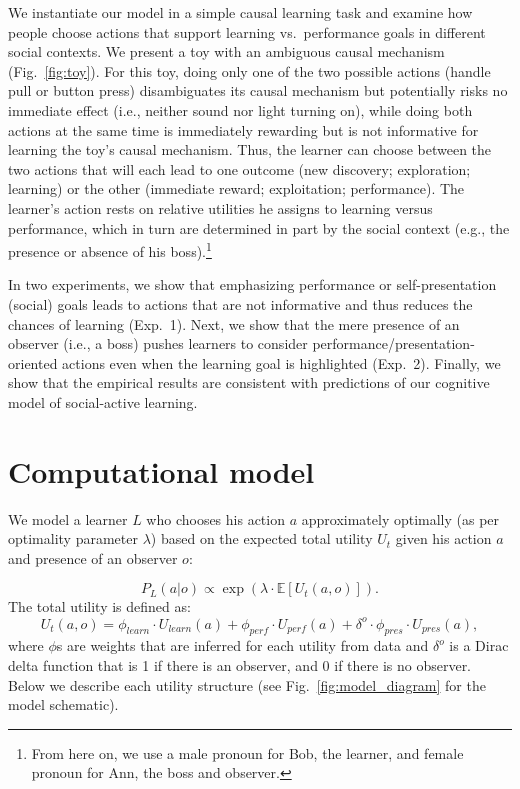 \documentclass[10pt, letterpaper]{article}
\begin{document}
We instantiate our model in a simple causal learning task and examine
how people choose actions that support learning vs.~performance goals in
different social contexts. We present a toy with an ambiguous causal
mechanism (Fig.~\ref{fig:toy}). For this toy, doing only one of the two
possible actions (handle pull or button press) disambiguates its causal
mechanism but potentially risks no immediate effect (i.e., neither sound
nor light turning on), while doing both actions at the same time is
immediately rewarding but is not informative for learning the toy's
causal mechanism. Thus, the learner can choose between the two actions
that will each lead to one outcome (new discovery; exploration;
learning) or the other (immediate reward; exploitation; performance).
The learner's action rests on relative utilities he assigns to learning
versus performance, which in turn are determined in part by the social
context (e.g., the presence or absence of his
boss).\footnote{From here on, we use a male pronoun for Bob, the learner, and female pronoun for Ann, the boss and observer.}

In two experiments, we show that emphasizing performance or
self-presentation (social) goals leads to actions that are not
informative and thus reduces the chances of learning (Exp.~1). Next, we
show that the mere presence of an observer (i.e., a boss) pushes
learners to consider performance/presentation-oriented actions even when
the learning goal is highlighted (Exp.~2). Finally, we show that the
empirical results are consistent with predictions of our cognitive model
of social-active learning.

\section{Computational model}\label{computational-model}

We model a learner \(L\) who chooses his action \(a\) approximately
optimally (as per optimality parameter \(\lambda\)) based on the
expected total utility \(U_{t}\) given his action \(a\) and presence of
an observer \(o\):

\[ P_L(a | o) \propto \exp(\lambda \cdot \mathbb{E}[U_{t}(a,o)]).\]
\noindent
The total utility is defined as:
\[U_{t}(a,o) = \phi_{learn} \cdot U_{learn}(a) + \phi_{perf} \cdot U_{perf}(a) + \delta^o \cdot \phi_{pres} \cdot U_{pres}(a),\]
\noindent
where \(\phi\)s are weights that are inferred for each utility from data
and \(\delta^o\) is a Dirac delta function that is 1 if there is an
observer, and 0 if there is no observer. Below we describe each utility
structure (see Fig.~\ref{fig:model_diagram} for the model schematic).
\end{document}
